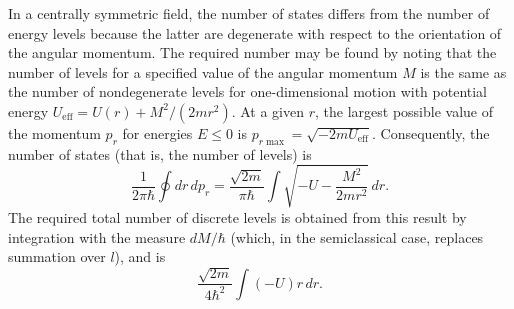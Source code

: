 \SolutionHeading In a centrally symmetric field, the number of states differs
from the number of energy levels because the latter are degenerate with respect
to the orientation of the angular momentum. The required number may be found by
noting that the number of levels for a specified value of the angular momentum
$M$ is the same as the number of nondegenerate levels for one-dimensional
motion with potential energy
$U_{\text{eff}}=U(r)+M^2/(2mr^2)$. At a given $r$, the largest possible value of
the momentum $p_r$ for energies $E\leq0$ is
$p_{r\max}=\sqrt{-2mU_{\text{eff}}}$. Consequently, the number of states (that
is, the number of levels) is
\[
  \frac1{2\pi\hbar}\oint dr\,dp_r
  =\frac{\sqrt{2m}}{\pi\hbar}\int
  \sqrt{-U-\frac{M^2}{2mr^2}}\,dr.
\]
The required total number of discrete levels is obtained from this result by
integration with the measure $dM/\hbar$ (which, in the semiclassical case,
replaces summation over $l$), and is
\[
  \frac{\sqrt{2m}}{4\hbar^2}\int(-U)r\,dr.
\]
